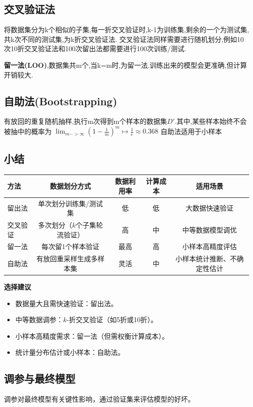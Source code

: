 \subsection{交叉验证法}
将数据集分为k个相似的子集,每一折交叉验证时,k-1为训练集,剩余的一个为测试集,共k次不同的测试集,为k折交叉验证法.
交叉验证法同样需要进行随机划分,例如10次10折交叉验证法和100次留出法都需要进行100次训练/测试.
\par \textbf{\heiti 留一法(LOO)},数据集共m个,当k=m时,为留一法.训练出来的模型会更准确,但计算开销较大.
\subsection{自助法(Bootstrapping)}
有放回的重复随机抽样,执行m次得到m个样本的数据集$D'$.其中,某些样本始终不会被抽中的概率为
$\lim_{m->\infty}(1-\frac{1}{m})^m\mapsto\frac{1}{e}\approx 0.368$
自助法适用于小样本
\subsection{小结}
\begin{table}[ht]
\centering
\begin{tabular}{lcccc}
\toprule
\textbf{方法} & \textbf{数据划分方式} & \textbf{数据利用率} & \textbf{计算成本} & \textbf{适用场景} \\
\midrule
留出法 & 单次划分训练集/测试集 & 低 & 低 & 大数据快速验证 \\
交叉验证 & 多次划分（\(k\)个子集轮流验证） & 高 & 中 & 中等数据模型调优 \\
留一法 & 每次留1个样本验证 & 最高 & 高 & 小样本高精度评估 \\
自助法 & 有放回重采样生成多样本集 & 灵活 & 中 & 小样本统计推断、不确定性估计 \\
\bottomrule
\end{tabular}
\end{table}

\textbf{\heiti 选择建议}
\begin{itemize}[noitemsep]
    \item 数据量大且需快速验证：留出法。
    \item 中等数据调参：\(k\)-折交叉验证（如5折或10折）。
    \item 小样本高精度需求：留一法（但需权衡计算成本）。
    \item 统计量分布估计或小样本：自助法。
\end{itemize}
\subsection{调参与最终模型}
调参对最终模型有关键性影响，通过验证集来评估模型的好坏。
\newpage
